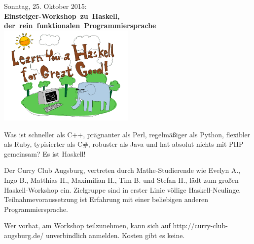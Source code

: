 \documentclass[a4paper,ngerman,landscape]{scrartcl}
\begin{document}
\begin{center}
  \Huge
  \vspace*{0.0em}
  Sonntag, 25. Oktober 2015: \\
  \mbox{\textbf{Einsteiger-Workshop zu Haskell,}} \\
  \mbox{\textbf{der rein funktionalen Programmiersprache}} \\
  \vfill
  \includegraphics[width=0.5\textwidth]{learn-you-a-haskell-for-great-good}
  \vfill

  \Large
  \begin{minipage}{0.77\textwidth}
    \setlength\parskip{\medskipamount}
    Was ist schneller als C++, prägnanter als Perl, regelmäßiger als Python,
    flexibler als Ruby, typisierter als C\#, robuster als Java und hat absolut
    nichts mit PHP gemeinsam? Es ist Haskell!

    Der Curry Club Augsburg, vertreten durch Mathe-Studierende wie Evelyn A.,
    Ingo B., Matthias H., Maximilian H., Tim B. und Stefan H., lädt zum großen
    Haskell-Workshop ein. Zielgruppe sind in erster Linie völlige
    Haskell-Neulinge. Teilnahmevoraussetzung ist Erfahrung mit einer beliebigen
    anderen Programmiersprache.

    Wer vorhat, am Workshop teilzunehmen, kann sich auf
    http:/$\!$/curry-club-augsburg.de/ unverbindlich anmelden. Kosten gibt es
    keine.
  \end{minipage}
\end{center}

\newpage
\vspace*{1.5em}
\end{document}
